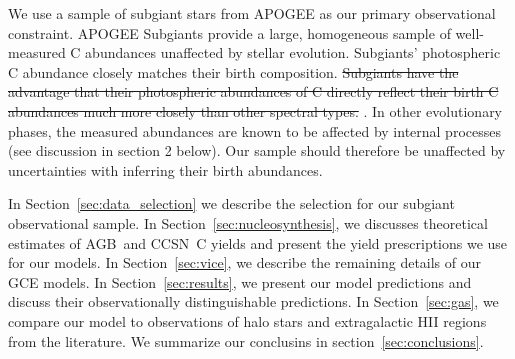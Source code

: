\documentclass[fleqn,
usenatbib]{mnras}
\newcommand{\agb}{AGB}
\newcommand{\cc}{CCSN}
\newcommand{\strike}[1]{{\color{ForestGreen} \sout{#1}}}
\newcommand{\dbstrike}[1]{{\color{Thistle} \sout{#1} }}
\newcommand{\dbadd}[1]{{\color{Thistle} #1}}
\newcommand{\dbnote}[1]{ {\color{Thistle} \textit{\small (DB: #1)}} }
\begin{document}
We use a sample of subgiant stars from APOGEE \citep{apogee17} as our primary observational constraint.
APOGEE Subgiants provide a large, homogeneous sample of well-measured C abundances unaffected by stellar evolution.
\dbadd{Subgiants' photospheric C abundance closely matches their birth composition.}
\dbstrike{Subgiants have the advantage that their photospheric abundances of C directly reflect their birth C abundances much more closely than other spectral types.} \citep{gilroy89, korn+07, lind+08, souto+18, souto19}.
In other evolutionary phases, the measured abundances are known to be affected by internal processes (see discussion in section 2 below).
Our sample should therefore be unaffected by uncertainties with inferring their birth abundances.




In Section~\ref{sec:data_selection} we describe the selection for our subgiant observational sample.
In Section~\ref{sec:nucleosynthesis}, we discusses theoretical estimates of \agb\ and \cc\ C yields and present the yield prescriptions we use for our models.
In Section~\ref{sec:vice}, we describe the remaining details of our GCE models.
In Section~\ref{sec:results}, we present our model predictions and discuss their observationally distinguishable predictions. 
In Section~\ref{sec:gas}, we compare our model to observations of halo stars and extragalactic HII regions from the literature. 
We summarize our conclusins in section~\ref{sec:conclusions}.





\end{document}
